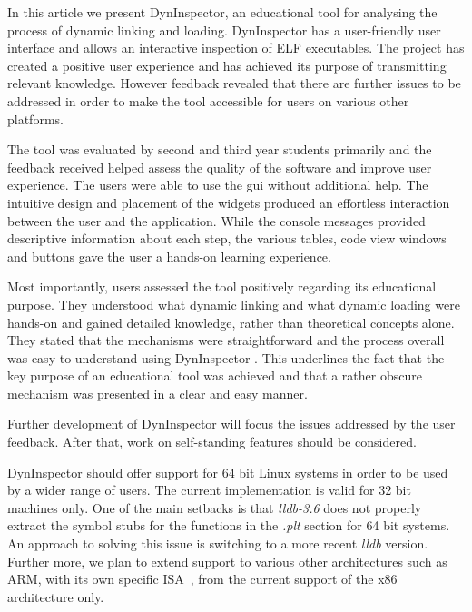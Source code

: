 In this article we present DynInspector, an educational tool for analysing the process of dynamic linking and loading. DynInspector has a user-friendly user interface and allows an interactive inspection of ELF executables. The project has created a positive user experience and has achieved its purpose of transmitting relevant knowledge. However feedback revealed that there are further issues to be addressed in order to make the tool accessible for users on various other platforms.

The tool was evaluated by second and third year students primarily and the feedback received helped assess the quality of the software and improve user experience. The users were able to use the gui without additional help. The intuitive design and placement of the widgets produced an effortless interaction between the user and the application. While the console messages provided descriptive information about each step, the various tables, code view windows and buttons gave the user a hands-on learning experience.

Most importantly, users assessed the tool positively regarding its educational purpose. They understood what dynamic linking and what dynamic loading were hands-on and gained detailed knowledge, rather than theoretical concepts alone. They stated that the mechanisms were straightforward and the process overall was easy to understand using DynInspector . This underlines the fact that the key purpose of an educational tool was achieved and that a rather obscure mechanism was presented in a clear and easy manner.

Further development of DynInspector will focus the issues addressed by the user feedback. After that, work on self-standing features should be considered.

DynInspector should offer support for 64 bit Linux systems in order to be used by a wider range of users. The current implementation is valid for 32 bit machines only. One of the main setbacks is that \textit{lldb-3.6} does not properly extract the symbol stubs for the functions in the \textit{.plt} section for 64 bit systems. An approach to solving this issue is switching to a more recent \textit{lldb} version. Further more, we plan to extend support to various other architectures such as ARM, with its own specific ISA~\cite{arm-manual}, from the current support of the x86 architecture only.
